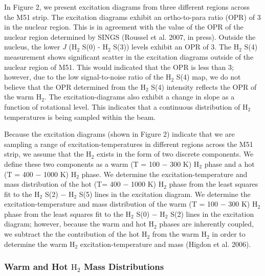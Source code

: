 \documentclass[manuscript]{aastex}
\begin{document}
In Figure 2, we present excitation diagrams from three different regions across the M51 strip.  The excitation diagrams exhibit an ortho-to-para ratio (OPR) of 3 in the nuclear region.  This is in agreement with the value of the OPR of the nuclear region determined by SINGS (Roussel et al. 2007, in press).  Outside the nucleus, the lower $J$ ($\mathrm{H_2}$ S(0) - $\mathrm{H_2}$ S(3)) levels exhibit an OPR of 3.  The $\mathrm{H_2}$ S(4) measurement shows significant scatter in the excitation diagrams outside of the nuclear region of M51.   This would indicated that the OPR is less than 3; however, due to the low signal-to-noise ratio of the $\mathrm{H_2}$ S(4) map, we do not believe that the OPR determined from the $\mathrm{H_2}$ S(4) intensity reflects the OPR of the warm $\mathrm{H_2}$.  The excitation-diagrams also exhibit a change in slope as a function of rotational level.  This indicates that a continuous distribution of $\mathrm{H_2}$ temperatures is being sampled within the beam.

Because the excitation diagrams (shown in Figure 2) indicate that we are sampling a range of excitation-temperatures in different regions across the M51 strip, we assume that the $\mathrm{H_2}$ exists in the form of two discrete components.  We define these two components as a warm (T = 100 $-$ 300 K) $\mathrm{H_2}$ phase and a hot (T = 400 $-$ 1000 K) $\mathrm{H_2}$ phase.  We determine the excitation-temperature and mass distribution of the hot  (T= 400 $-$ 1000 K) $\mathrm{H_2}$ phase from the least squares fit to the $\mathrm{H_2}$ S(2) $-$ $\mathrm{H_2}$ S(5) lines in the excitation diagram.  We determine the excitation-temperature and mass distribution of the warm (T = 100 $-$ 300 K) $\mathrm{H_2}$ phase from the least squares fit to the $\mathrm{H_2}$ S(0) $-$ $\mathrm{H_2}$ S(2) lines in the excitation diagram; however, because the warm and hot $\mathrm{H_2}$ phases are inherently coupled, we subtract the the contribution of the hot $\mathrm{H_2}$ from the warm $\mathrm{H_2}$ in order to determine the warm $\mathrm{H_2}$ excitation-temperature and mass (Higdon et al. 2006).

\subsubsection{Warm and Hot $\mathrm{H_2}$ Mass Distributions}
\end{document}
